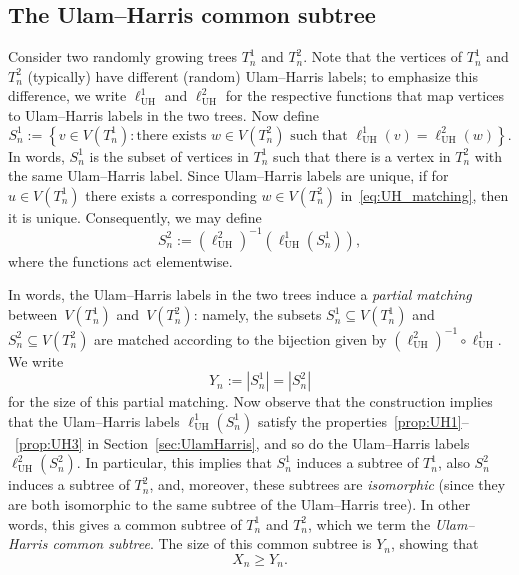\documentclass[11pt]{article}
\numberwithin{equation}{section}
\newcommand{\UH}{\mathrm{UH}} %
\theoremstyle{definition}
\begin{document}
\subsection{The Ulam--Harris common subtree}\label{sec:UH_common_subtree}

Consider two randomly growing trees $T_{n}^{1}$ and $T_{n}^{2}$. 
Note that the vertices of $T_{n}^{1}$ and $T_{n}^{2}$ (typically) have different (random) Ulam--Harris labels; 
to emphasize this difference, we write $\ell_{\UH}^{1}$ and $\ell_{\UH}^{2}$ for the respective functions that map vertices to Ulam--Harris labels in the two trees. 
Now define 
\begin{equation}\label{eq:UH_matching}
S_{n}^{1} := \left\{ v \in V \left( T_{n}^{1} \right) : \text{there exists } w \in V\left( T_{n}^{2} \right) \text{ such that } \ell_{\UH}^{1}(v) = \ell_{\UH}^{2}(w) \right\}.
\end{equation}
In words, $S_{n}^{1}$ is the subset of vertices in $T_{n}^{1}$ such that there is a vertex in $T_{n}^{2}$ with the same Ulam--Harris label. 
Since Ulam--Harris labels are unique, if for $u\in V(T_n^1)$ there exists a corresponding $w\in V(T_n^2)$ in~\eqref{eq:UH_matching}, then it is unique.
Consequently, we may define 
\[
S_{n}^{2} := \left( \ell_{\UH}^{2} \right)^{-1} \left( \ell_{\UH}^{1} \left( S_{n}^{1} \right) \right),
\]
where the functions act elementwise. 

In words, the Ulam--Harris labels in the two trees induce a \emph{partial matching} between~$V(T_{n}^{1})$ and~$V(T_{n}^{2})$: 
namely, the subsets $S_{n}^{1} \subseteq V(T_{n}^{1})$ and $S_{n}^{2} \subseteq V(T_{n}^{2})$ are matched according to the bijection given by $\left( \ell_{\UH}^{2} \right)^{-1} \circ \ell_{\UH}^{1}$. 
We write 
\begin{equation*}\label{eq:Yn}
Y_{n} := \left| S_{n}^{1} \right| = \left| S_{n}^{2} \right|
\end{equation*}
for the size of this partial matching. 
Now observe that the construction implies that the Ulam--Harris labels $\ell_{\UH}^{1}(S_{n}^{1})$ satisfy the properties~\ref{prop:UH1}--~\ref{prop:UH3} in Section~\ref{sec:UlamHarris}, and so do the Ulam--Harris labels $\ell_{\UH}^{2}(S_{n}^{2})$. In particular, this implies that $S_{n}^{1}$ induces a subtree of $T_{n}^{1}$, 
also $S_{n}^{2}$ induces a subtree of $T_{n}^{2}$, 
and, moreover, these subtrees are \emph{isomorphic} (since they are both isomorphic to the same subtree of the Ulam--Harris tree). 
In other words, this gives a common subtree of $T_{n}^{1}$ and $T_{n}^{2}$, 
which we term the 
\emph{Ulam--Harris common subtree}. 
The size of this common subtree is $Y_{n}$, 
showing that 
\begin{equation}\label{eq:UH_LB}
X_{n} \geq Y_{n}. 
\end{equation}
\end{document}
